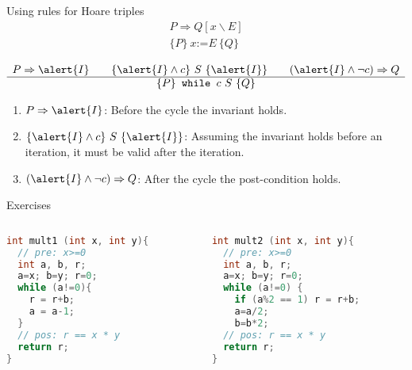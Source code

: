 \documentclass[aspectratio=169]{beamer}
\begin{document}
\begin{frame}{Using rules for Hoare triples}
  $$\begin{array}{c}
    P \Rightarrow Q[x\backslash E]
    \\\hline
    \{P\}~x\texttt{:=}E~\{Q\}
    \end{array}$$

  $$\begin{array}{c}
    P\Rightarrow \alert{I} \qquad \{\alert{I}\land c\} ~S~ \{\alert{I}\} \qquad (\alert{I} \land \lnot c)\Rightarrow Q
    \\\hline
    \{P\} \texttt{ while }c~S~\{Q\}
    \end{array}$$

    \begin{enumerate}
      \item $P \Rightarrow \alert{I}$: Before the cycle the invariant holds.
      \item $\{\alert{I} \land c\}~S~\{ \alert{I} \}$: Assuming the invariant holds before an iteration, it must be valid after the iteration.
      \item $(\alert{I} \land \lnot c) \Rightarrow Q$: After the cycle the post-condition holds.
    \end{enumerate}
\end{frame}


\begin{frame}[fragile]{Exercises}
  
\begin{columns}
\begin{column}{0.48\textwidth}
\begin{lstlisting}[language=C++]
int mult1 (int x, int y){
  // pre: x>=0
  int a, b, r;
  a=x; b=y; r=0;
  while (a!=0){
    r = r+b;
    a = a-1;
  }
  // pos: r == x * y 
  return r;
}
\end{lstlisting}
\end{column}
\begin{column}{0.48\textwidth}
\begin{lstlisting}[language=C++]
int mult2 (int x, int y){
  // pre: x>=0
  int a, b, r;
  a=x; b=y; r=0;
  while (a!=0) {
    if (a%2 == 1) r = r+b;
    a=a/2;
    b=b*2;
  // pos: r == x * y
  return r;
}
\end{lstlisting}
\end{column}
\end{columns}

%
\end{frame}
\exerciseBack
\end{document}
